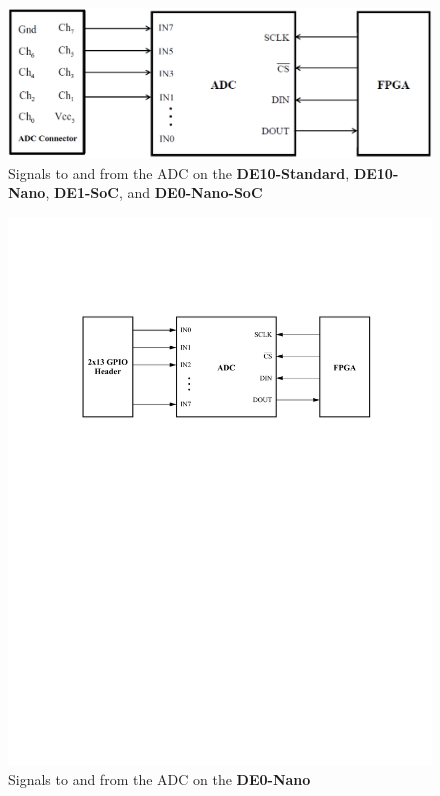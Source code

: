 \documentclass[11pt, twoside, pdftex]{article}
\begin{document}
\begin{figure} [H]
\begin{center}
\includegraphics[scale = 0.47]{figures/signal_diagram.png}
\end{center}
\caption{Signals to and from the ADC on the \textbf{DE10-Standard}, \textbf{DE10-Nano}, \textbf{DE1-SoC}, and \textbf{DE0-Nano-SoC}}
\label{fig:signal}
\end{figure}

\begin{figure} [H]
\begin{center}
\includegraphics[scale = 0.9]{figures/signal_diagram_de0nano.pdf}
\end{center}
\caption{Signals to and from the ADC on the {\bf DE0-Nano} }
\label{fig:signal2}
\end{figure}
\end{document}
